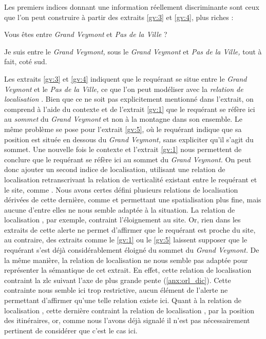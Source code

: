 Les premiers indices donnant une information réellement discriminante
sont ceux que l'on peut construire à partir des extraits \ref{gv:3} et
\ref{gv:4}, plus riches :
%
\begin{dialogue*}
  \Sec {} Vous êtes entre \emph{Grand Veymont} et
  \emph{Pas de la Ville} ?

  \Req {} Je suis entre le \emph{Grand Veymont,}
   sous le \emph{Grand Veymont} et \emph{Pas de la
    Ville,} tout à fait,  coté sud.
\end{dialogue*}
% 
Les extraits \ref{gv:3} et \ref{gv:4} indiquent que le requérant se
situe entre le \emph{Grand Veymont} et le \emph{Pas de la Ville,} ce
que l'on peut modéliser avec la \emph{relation de localisation}
. Bien que ce ne soit pas explicitement
mentionné dans l'extrait, on comprend à l'aide du contexte et de
l'extrait \ref{gv:1} que le requérant se réfère ici au \emph{sommet}
du \emph{Grand Veymont} et non à la montagne dans son ensemble. Le
même problème se pose pour l'extrait \ref{gv:5}, où le requérant
indique que sa position est située en dessous du \emph{Grand Veymont,}
sans expliciter qu'il s'agit du sommet. Une nouvelle fois le contexte
et l'extrait \ref{gv:1} nous permettent de conclure que le requérant
se réfère ici au sommet du \emph{Grand Veymont.} On peut donc ajouter
un second indice de localisation, utilisant une relation de
localisation retranscrivant la relation de verticalité existant entre
le requérant et le site, comme . Nous avons
certes défini plusieurs relations de localisation dérivées de cette
dernière, comme  et permettant une
spatialisation plus fine, mais aucune d'entre elles ne nous semble
adaptée à la situation. La relation de localisation
, par exemple, contraint l'éloignement au
site. Or, rien dans les extraits de cette alerte ne permet d'affirmer
que le requérant est proche du site, au contraire, des extraits comme
le \ref{gv:1} ou le \ref{gv:5} laissent supposer que le requérant
s'est déjà considérablement éloigné du sommet du \emph{Grand Veymont.}
De la même manière, la relation de localisation
 ne nous semble pas adaptée pour
représenter la sémantique de cet extrait. En effet, cette relation de
localisation contraint la \ac{zlc} suivant l'axe de plus grande pente
(\autoref{anx:orl_dic}). Cette contrainte nous semble ici trop
restrictive, aucun élément de l'alerte ne permettant d'affirmer qu'une
telle relation existe ici. Quant à la relation de localisation
, cette dernière contraint la
relation de localisation , par la position
des itinéraires, or, comme nous l'avons déjà signalé il n'est pas
nécessairement pertinent de considérer que c'est le cas ici.

